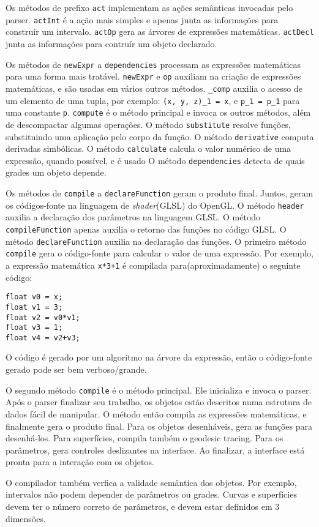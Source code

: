 Os métodos de prefixo \texttt{act} implementam as
ações semânticas invocadas pelo parser.
\texttt{actInt} é a ação mais simples e apenas junta as informações
para construír um intervalo.
\texttt{actOp} gera as árvores de expressões matemáticas.
\texttt{actDecl} junta as informações para contruír um objeto declarado.

Os métodos de \texttt{newExpr} a \texttt{dependencies} processam
as expressões matemáticas para uma forma mais tratável.
\texttt{newExpr} e \texttt{op} auxiliam na criação de expressões matemáticas, e são usadas
em vários outros métodos.
\texttt{\_comp} auxilia o acesso de um elemento de uma tupla, por exemplo:
\texttt{(x, y, z)\_1 = x}, e \texttt{p\_1 = p\_1} para uma constante \texttt{p}.
\texttt{compute} é o método principal e invoca os outros métodos, além de
descompactar algumas operações.
O método \texttt{substitute} resolve funções, substituindo uma aplicação pelo corpo da função.
O método \texttt{derivative} computa derivadas simbólicas.
O método \texttt{calculate} calcula o valor numérico de uma expressão, 
quando possível, e é usado 
O método \texttt{dependencies} detecta de quais grades um objeto depende.

Os métodos de \texttt{compile} a \texttt{declareFunction} geram o produto final.
Juntos, geram os códigos-fonte na linguagem de \textit{shader}(GLSL) do OpenGL.
O método \texttt{header} auxilia a declaração dos parâmetros na linguagem GLSL.
O método \texttt{compileFunction} apenas auxilia o retorno das funções no código GLSL.
O método \texttt{declareFunction} auxilia na declaração das funções.
O primeiro método \texttt{compile} gera o código-fonte para calcular o valor de uma
expressão.
Por exemplo, a expressão matemática \texttt{x*3+1} é
compilada para(aproximadamente) o seguinte código:

\begin{lstlisting}
float v0 = x;
float v1 = 3;
float v2 = v0*v1;
float v3 = 1;
float v4 = v2+v3;
\end{lstlisting}

O código é gerado por um algoritmo na árvore da expressão,
então o código-fonte gerado pode ser bem verboso/grande.

O segundo método \texttt{compile} é o método principal.
Ele inicializa e invoca o parser.
Após o parser finalizar seu trabalho, os objetos estão descritos
numa estrutura de dados fácil de manipular.
O método então compila as expressões matemáticas, e finalmente gera o produto final.
Para os objetos desenháveis, gera as funções para desenhá-los.
Para superfícies, compila também o geodesic tracing.
Para os parâmetros, gera controles deslizantes na interface.
Ao finalizar, a interface está pronta para a interação com os objetos.

O compilador também verfica a validade semântica dos objetos.
Por exemplo, intervalos não podem depender de parâmetros ou grades.
Curvas e superfícies devem ter o número correto de parâmetros, e devem estar
definidos em 3 dimensões.
